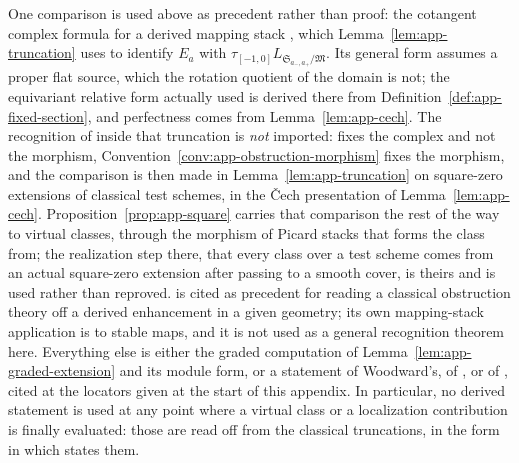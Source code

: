 \begin{remark}
\label{rem:app-imports}
One comparison is used above as precedent rather than proof: the cotangent
complex formula for a derived mapping stack \cite{ToenVezzosiHAGII}, which
Lemma~\ref{lem:app-truncation} uses to identify \(E_a\)
with \(\tau_{[-1,0]}L_{\mathfrak S_{a_-,a_+}/\mathfrak M}\).  Its general form
assumes a proper flat source, which the rotation quotient of the domain is
not; the equivariant relative form actually used is derived there from
Definition~\ref{def:app-fixed-section}, and perfectness comes from
Lemma~\ref{lem:app-cech}.  The recognition of
\cite[Definition~7.13]{WoodwardQKIII} inside that truncation is
\emph{not} imported: \cite[Definition~7.13]{WoodwardQKIII} fixes the complex
and not the morphism, Convention~\ref{conv:app-obstruction-morphism} fixes the
morphism, and the comparison is then made in
Lemma~\ref{lem:app-truncation} on square-zero extensions of classical test
schemes, in the \v{C}ech presentation of Lemma~\ref{lem:app-cech}.
Proposition~\ref{prop:app-square} carries that comparison the rest of the way
to virtual classes, through the morphism of Picard stacks that
\cite{BehrendFantechi} forms the class from; the realization step there, that
every class over a test scheme comes from an actual square-zero extension after
passing to a smooth cover, is theirs and is used rather than reproved.
\cite{SchurgToenVezzosi} is cited as precedent for reading a classical
obstruction theory off a derived enhancement in a given geometry; its own
mapping-stack application is to stable maps, and it is not used as a general
recognition theorem here.  Everything else is
either the graded computation of Lemma~\ref{lem:app-graded-extension} and its
module form, or a statement of Woodward's, of
\cite{GonzalezWoodward}, or of \cite{GraberPandharipande}, cited at the
locators given at the
start of this appendix.  In particular, no derived statement is used at any
point where a virtual class or a localization contribution is finally
evaluated: those are read off from the classical truncations, in the form in
which \cite{WoodwardQKIII} states them.
\end{remark}
